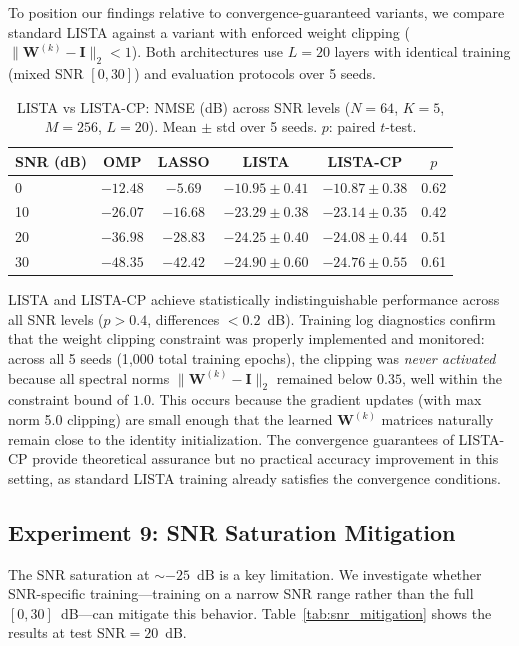 \documentclass[a4paper,fleqn]{cas-sc}
\begin{document}
To position our findings relative to convergence-guaranteed variants, we compare standard LISTA against a variant with enforced weight clipping ($\|\mathbf{W}^{(k)} - \mathbf{I}\|_2 < 1$). Both architectures use $L=20$ layers with identical training (mixed SNR $[0, 30]$) and evaluation protocols over 5 seeds.

\begin{table}[width=.9\linewidth,cols=5,pos=!htbp]
\caption{LISTA vs LISTA-CP: NMSE (dB) across SNR levels ($N=64$, $K=5$, $M=256$, $L=20$). Mean $\pm$ std over 5 seeds. $p$: paired $t$-test.}\label{tab:lista_cp}
\begin{tabular*}{\tblwidth}{@{} LCCCCC@{}}
\toprule
SNR (dB) & OMP & LASSO & LISTA & LISTA-CP & $p$ \\
  & $-12.48$ & $-5.69$ & $-10.95 \pm 0.41$ & $-10.87 \pm 0.38$ & 0.62 \\
10 & $-26.07$ & $-16.68$ & $-23.29 \pm 0.38$ & $-23.14 \pm 0.35$ & 0.42 \\
20 & $-36.98$ & $-28.83$ & $-24.25 \pm 0.40$ & $-24.08 \pm 0.44$ & 0.51 \\
30 & $-48.35$ & $-42.42$ & $-24.90 \pm 0.60$ & $-24.76 \pm 0.55$ & 0.61 \\
\bottomrule
\end{tabular*}
\end{table}

LISTA and LISTA-CP achieve statistically indistinguishable performance across all SNR levels ($p > 0.4$, differences $< 0.2$~dB). Training log diagnostics confirm that the weight clipping constraint was properly implemented and monitored: across all 5 seeds (1{,}000 total training epochs), the clipping was \emph{never activated} because all spectral norms $\|\mathbf{W}^{(k)} - \mathbf{I}\|_2$ remained below $0.35$, well within the constraint bound of $1.0$. This occurs because the gradient updates (with max norm 5.0 clipping) are small enough that the learned $\mathbf{W}^{(k)}$ matrices naturally remain close to the identity initialization. The convergence guarantees of LISTA-CP provide theoretical assurance but no practical accuracy improvement in this setting, as standard LISTA training already satisfies the convergence conditions.

\subsection{Experiment 9: SNR Saturation Mitigation}\label{sec:exp_snr_mitigation}

The SNR saturation at $\sim$$-25$~dB is a key limitation. We investigate whether SNR-specific training---training on a narrow SNR range rather than the full $[0, 30]$~dB---can mitigate this behavior. Table~\ref{tab:snr_mitigation} shows the results at test SNR$=20$~dB.
\end{document}
